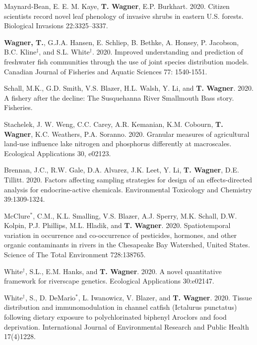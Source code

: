 \documentclass[10pt]{article}
\begin{document}
\begin{flushleft}
\begin{etaremune}[start=103]
\item Maynard-Bean, E. E. M. Kaye, \textbf{T. Wagner}, E.P. Burkhart. 2020. Citizen scientists record novel leaf phenology of invasive shrubs in eastern U.S. forests. Biological Invasions 22:3325–3337.	

\item \textbf{Wagner, T.}, G.J.A. Hansen, E. Schliep, B. Bethke, A. Honsey, P. Jacobson, B.C. Kline$^\ddagger$, and S.L. White$^\dagger$. 2020. Improved understanding and prediction of freshwater fish communities through the use of joint species distribution models. Canadian Journal of Fisheries and Aquatic Sciences 77: 1540-1551.

\item Schall, M.K., G.D. Smith, V.S. Blazer, H.L. Walsh, Y. Li, and \textbf{T. Wagner}.  2020.  A fishery after the decline: The Susquehanna River Smallmouth Bass story.  Fisheries.	
	
\item Stachelek, J. W. Weng, C.C. Carey, A.R. Kemanian, K.M. Cobourn, \textbf{T. Wagner}, K.C. Weathers, P.A. Soranno. 2020. Granular measures of agricultural land-use influence lake nitrogen and phosphorus differently at macroscales. Ecological Applications 30, e02123.

\item Brennan, J.C., R.W. Gale, D.A. Alvarez, J.K. Leet, Y. Li, \textbf{T. Wagner}, D.E. Tillitt. 2020. Factors affecting sampling strategies for design of an effects-directed analysis for endocrine-active chemicals. Environmental Toxicology and Chemistry 39:1309-1324.

\item McClure$^*$, C.M., K.L. Smalling, V.S. Blazer, A.J. Sperry, M.K. Schall, D.W. Kolpin, P.J. Phillips, M.L. Hladik, and \textbf{T. Wagner}. 2020. Spatiotemporal variation in occurrence and co-occurrence of pesticides, hormones, and other organic contaminants in rivers in the Chesapeake Bay Watershed, United States. Science of The Total Environment 728:138765.

\item  White$^\dagger$, S.L., E.M. Hanks, and \textbf{T. Wagner}. 2020. A novel quantitative framework for riverscape genetics. Ecological Applications 30:e02147.

\item White$^\dagger$, S., D. DeMario$^*$, L. Iwanowicz, V. Blazer, and \textbf{T. Wagner}. 2020. Tissue distribution and immunomodulation in channel catfish (Ictalurus punctatus) following dietary exposure to polychlorinated biphenyl Aroclors and food deprivation. International Journal of Environmental Research and Public Health 17(4)1228.


\end{etaremune}
\end{flushleft}
\end{document}
